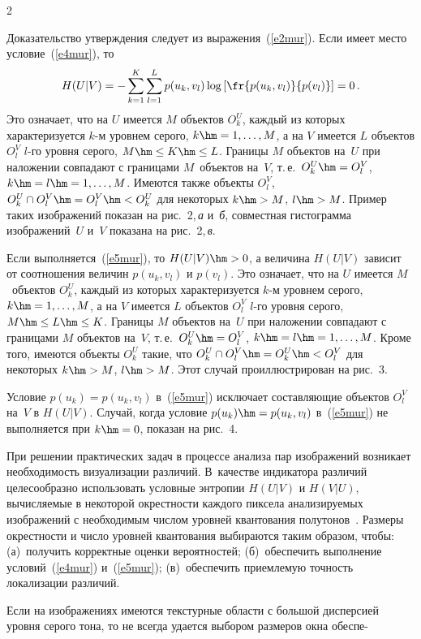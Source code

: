 \begin{multicols}{2}
  
  \smallskip
  
  Доказательство утверждения следует из выражения~(\ref{e2mur}). Если имеет место 
условие~(\ref{e4mur}), то 
  \begin{equation*}
  H(U\vert V) = -\sum\limits_{k=1}^K \sum\limits_{l=1}^L p(u_k,v_l)\log \left[ 
\fr{p(u_k,v_l)}{p(v_l)}\right] =0\,.
  \end{equation*}
    Это означает, что на $U$ имеется $M$ объектов $O_k^U$, каждый из которых 
характеризуется $k$-м уровнем серого, $k\hm = 1, \ldots , M$, а на $V$ имеется $L$ объектов 
$O_l^V$ $l$-го уровня серого, $M\hm\leq K\hm\leq L$. Границы $M$ объектов на~$U$ при 
наложении совпадают с границами $M$~объектов на~$V$, т.\,е.\ $O_k^U\hm=O_l^V$, $k\hm 
=l\hm= 1, \ldots , M$. Имеются также объекты $O_l^V$, $O_k^U\cap 
O_l^V\hm=O_l^V\hm<O_k^U$ для некоторых $k\hm>M$, $l\hm>M$. Пример таких 
изображений показан на рис.~2,\,\textit{а} и~\textit{б}, совместная гистограмма 
изображений~$U$ и~$V$ показана на рис.~2,\,\textit{в}.
  

      
  Если выполняется~(\ref{e5mur}), то $H(U\vert V)\hm>0$, а величина $H(U\vert V)$ зависит 
от соотношения величин $p(u_k,v_l)$ и $p(v_l)$. Это означает, что на $U$ имеется 
$M$~объектов $O_k^U$, каждый из которых характеризуется $k$-м уровнем серого, $k\hm = 
1, \ldots , M$, а на $V$ имеется $L$ объектов $O_l^V$ $l$-го уровня серого, $M\hm\leq 
L\hm\leq K$. Границы $M$ объектов на~$U$ при наложении совпадают с границами $M$ 
объектов на~$V$, т.\,е.\ $O_k^U\hm=O_l^V$, $k\hm = l \hm= 1, \ldots , M$. Кроме того, 
имеются объекты $O_k^U$ такие, что $O_k^U\cap O_l^V\hm= O_k^U\hm<O_l^V$ для 
некоторых $k\hm>M$, $l\hm>M$. Этот случай проиллюстрирован на рис.~3.


  
  Условие $p(u_k) =p(u_k,v_l)$ в~(\ref{e5mur}) исключает со\-став\-ля\-ющие объектов $O_l^V$ 
на~$V$ в $H(U\vert V)$. Случай, когда условие $p(u_k)\hm=p(u_k,v_l)$ в~(\ref{e5mur}) не 
выполняется при $k\hm = 0$, показан на рис.~4.
  
  При решении практических задач в процессе анализа пар изображений возникает 
необходимость визуализации различий. В~качестве индикатора\linebreak
 различий целесообразно 
использовать условные энтропии $H(U\vert V)$ и $H(V\vert U)$, вычисляемые в некоторой 
окрестности каждого пиксела ана\-ли\-зи\-ру\-емых изображений с необходимым числом уровней 
квантования полутонов~\cite{15mur}. Размеры окрестности и число уровней квантования 
выбираются таким образом, чтобы: (а)~получить корректные оценки вероятностей; 
(б)~обеспечить выполнение условий~(\ref{e4mur}) и~(\ref{e5mur}); (в)~обеспечить 
приемлемую точность локализации различий.



  
  Если на изображениях имеются текстурные об\-ласти с большой дисперсией уровня серого 
тона, то не всегда удается выбором размеров окна обеспе-\linebreak\vspace*{-12pt}
\pagebreak

\end{multicols}

